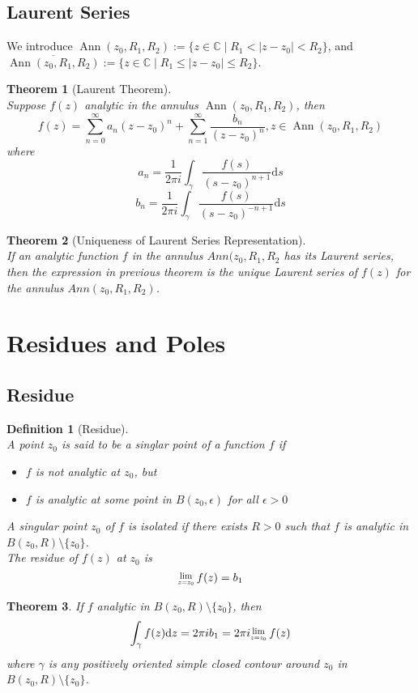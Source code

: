\documentclass[12pt]{article}
\newcommand{\diff}{\mathrm{d}}
\newcommand{\Res}[1]{\raisebox{0.5ex}{\scalebox{0.8}{$\displaystyle \lim_{#1}\;$}}}
\newtheorem{definition}{Definition}[section]
\newtheorem{theorem}{Theorem}[section]
\theoremstyle{definition}
\DeclareMathOperator{\Ann}{Ann}
\begin{document}
\subsection{Laurent Series}
We introduce $\Ann(z_0, R_1, R_2):=\{z\in \mathbb{C} \mid R_1 < |z-z_0| < R_2\}$, and 
$\overline{\Ann(z_0, R_1, R_2)}:= \{z\in \mathbb{C} \mid R_1 \leq |z-z_0| \leq R_2\}$.
\begin{theorem}[Laurent Theorem]
\hfill\\\normalfont Suppose $f(z)$ analytic in the annulus $\Ann(z_0, R_1, R_2)$, then
\[
f(z) = \sum_{n=0}^\infty a_n (z-z_0)^n + \sum_{n=1}^\infty \frac{b_n}{(z-z_0)^n}, z\in \Ann(z_0, R_1, R_2)
\]
where 
\[
a_n = \frac{1}{2\pi i}\int_{\gamma}\frac{f(s)}{(s-z_0)^{n+1}}\diff s
\]
\[
b_n = \frac{1}{2\pi i}\int_\gamma \frac{f(s)}{(s-z_0)^{-n+1}}\diff s
\]
\end{theorem}
\begin{theorem}[Uniqueness of Laurent Series Representation]
\hfill\\\normalfont If an analytic function $f$ in the annulus $Ann(z_0, R_1, R_2$ has its Laurent series, then the expression in previous theorem is the unique Laurent series of $f(z)$ for the annulus $Ann(z_0, R_1, R_2)$.
\end{theorem}
\clearpage
\section{Residues and Poles}
\subsection{Residue}
\begin{definition}[Residue]
\hfill\\\normalfont A point $z_0$ is said to be a singlar point of a function $f$ if
\begin{itemize}
	\item $f$ is not analytic at $z_0$, but
	\item $f$ is analytic at some point in $B(z_0, \epsilon)$ for all $\epsilon>0$
\end{itemize}
A singular point $z_0$ of $f$ is isolated if there exists $R>0$ such that $f$ is analytic in $B(z_0, R)\setminus \{z_0\}$.\\
The residue of $f(z)$ at $z_0$ is
\[
\Res{z=z_0}f(z)=b_1
\]
\end{definition}
\begin{theorem}\normalfont If $f$ analytic in $B(z_0, R)\setminus \{z_0\}$, then
\[
\int_\gamma f(z)\diff z = 2\pi i b_1 = 2\pi i\Res{z=z_0}f(z)
\]
where $\gamma$ is any positively oriented simple closed contour around $z_0$ in $B(z_0, R)\setminus \{z_0\}$.
\end{theorem}
\end{document}
